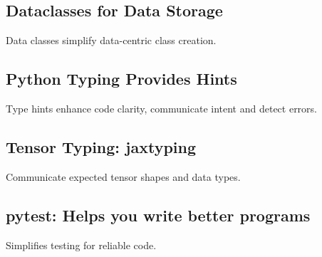 \subsection{Dataclasses for Data Storage}
\begin{notes}
    Data classes simplify data-centric class creation.
\end{notes}

\subsection{Python Typing Provides Hints}
\begin{notes}
    Type hints enhance code clarity, communicate intent and detect errors.
\end{notes}

\subsection{Tensor Typing: jaxtyping}
\begin{notes}
    Communicate expected tensor shapes and data types. 
\end{notes}

\subsection{pytest: Helps you write better programs}
\begin{notes}
    Simplifies testing for reliable code.
\end{notes}

